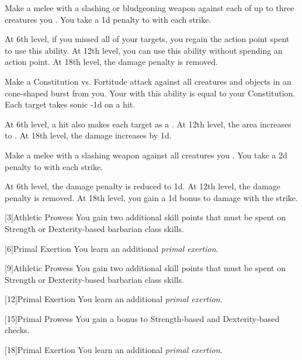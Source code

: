 {             Make a melee  with a slashing or bludgeoning weapon against each of up to three creatures you .
            You take a \minus1d penalty to  with each strike.
            \par At 6th level, if you missed all of your targets, you regain the action point spent to use this ability.
            At 12th level, you can use this ability without spending an action point.
            At 18th level, the damage penalty is removed.

             Make a Constitution vs. Fortitude attack against all creatures and objects in an \areamed cone-shaped burst from you.
            Your  with this ability is equal to your Constitution.
            Each target takes sonic  -1d on a hit.
            \par At 6th level, a hit also makes each target  as a .
            At 12th level, the area increases to \arealarge.
            At 18th level, the damage increases by \plus1d.

             Make a melee  with a slashing weapon against all creatures you .
            You take a \minus2d penalty to  with each strike.
            \par At 6th level, the damage penalty is reduced to \minus1d.
            At 12th level, the damage penalty is removed.
            At 18th level, you gain a \plus1d bonus to damage with the strike.
        }

        [3]{Athletic Prowess} You gain two additional skill points that must be spent on Strength or Dexterity-based barbarian class skills.

        [6]{Primal Exertion}
        You learn an additional \textit{primal exertion}.

        [9]{Athletic Prowess} You gain two additional skill points that must be spent on Strength or Dexterity-based barbarian class skills.

        [12]{Primal Exertion}
        You learn an additional \textit{primal exertion}.

        [15]{Primal Prowess}
        You gain a  bonus to Strength-based and Dexterity-based checks.

        [18]{Primal Exertion}
        You learn an additional \textit{primal exertion}.

